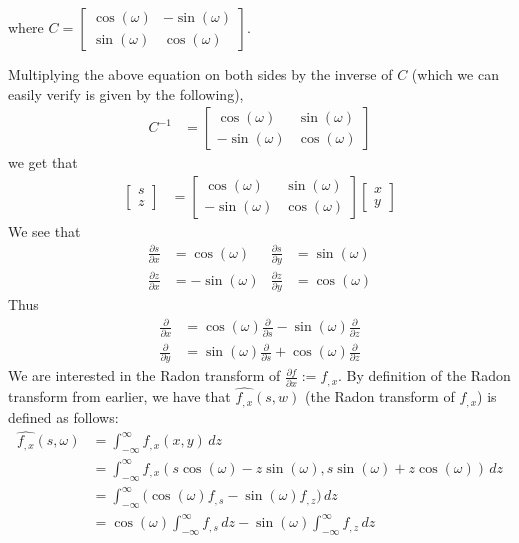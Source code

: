 where $C = \begin{bmatrix} \cos (\omega) & - \sin (\omega) \\ \sin (\omega) & \cos (\omega)\end{bmatrix}$.
\par 
Multiplying the above equation on both sides by the inverse of $C$ (which we can easily verify is given by the following),
\begin{align*}
	C^{-1} & = 
	\begin{bmatrix}
		\cos (\omega)  & \sin(\omega) \\
		-\sin (\omega) & \cos(\omega)
	\end{bmatrix}
\end{align*}
we get that
\begin{align*}
	\begin{bmatrix}
	s \\
	z
	\end{bmatrix}
	& =
	\begin{bmatrix}
		\cos (\omega) & \sin (\omega) \\
		-\sin (\omega) & \cos (\omega)
	\end{bmatrix}
	\begin{bmatrix}
		x \\
		y
	\end{bmatrix}
\end{align*}
We see that
\begin{align*}
	\frac{\partial s}{\partial x} & = \cos (\omega) & \frac{\partial s}{\partial y} & = \sin (\omega) \\
	\frac{\partial z}{\partial x} & = -\sin (\omega) & \frac{\partial z}{\partial y} & = \cos (\omega)
\end{align*}
Thus
\begin{align*}
	\frac{\partial}{\partial x} & = \cos (\omega) \frac{\partial}{\partial s} -\sin (\omega) \frac{\partial}{\partial z} \\
	\frac{\partial}{\partial y} & = \sin (\omega) \frac{\partial}{\partial s} + \cos (\omega) \frac{\partial}{\partial z}
\end{align*}
We are interested in the Radon transform of $\frac{\partial f}{\partial x} := f_{, x}$.
By definition of the Radon transform from earlier, we have that $\widehat{f_{, x}}(s, w)$ (the Radon transform of $f_{, x}$) is defined as follows:
\begin{align*}
	\widehat{f_{, x}}(s, \omega) & = \int_{-\infty}^{\infty} f_{, x}(x, y) \, dz \\
							& = \int_{-\infty}^{\infty} f_{, x}(s \cos (\omega) - z \sin (\omega), s \sin (\omega) + z \cos (\omega)) \, dz \\
							& = \int_{-\infty}^{\infty} \Big( \cos (\omega) f_{, s} - \sin (\omega) f_{, z} \Big) \, dz \\
							& = \cos (\omega) \int_{-\infty}^{\infty} f_{, s} \, dz - \sin (\omega) \int_{-\infty}^{\infty} f_{, z} \, dz
\end{align*}
